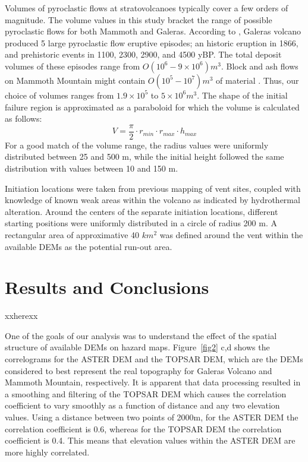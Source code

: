 \documentclass{article}
\begin{document}
Volumes of pyroclastic flows at stratovolcanoes typically cover a few
orders of magnitude. The volume values in this study bracket the range
of possible pyroclastic flows for both Mammoth and Galeras.  According
to \citet{calvache_1990a}, Galeras volcano produced 5 large
pyroclastic flow eruptive episodes; an historic eruption in 1866, and
prehistoric events in 1100, 2300, 2900, and 4500 yBP.  The total
deposit volumes of these episodes range from $O(10^6 - 9\times 10^6)
m^3$.  Block and ash flows on Mammoth Mountain might contain $O(10^5 -
10^7) m^3$ of material \citep{Patra2005, Burkett2007}.  Thus, our
choice of volumes ranges from $1.9 \times 10^5$ to $5 \times 10^6
m^3$.  The shape of the initial failure region is approximated as a
paraboloid for which the volume is calculated as follows:
\begin{equation}
 V=\frac{\pi}{2}\cdot r_{min}\cdot r_{max} \cdot h_{max}
\label{eq:three}
\end{equation}
For a good match of the volume range, the radius values were uniformly
distributed between 25 and 500 m, while the initial height followed
the same distribution with values between 10 and 150 m.

Initiation locations were taken from previous mapping of vent sites,
coupled with knowledge of known weak areas within the volcano as
indicated by hydrothermal alteration.  Around the centers of the
separate initiation locations, different starting positions were
uniformly distributed in a circle of radius 200 m.  A rectangular area
of approximative 40 $km^2$ was defined around the vent within the
available DEMs as the potential run-out area.

\section{Results and Conclusions}
xxherexx

One of the goals of our analysis was to understand the effect of the
spatial structure of available DEMs on hazard maps. Figure~\ref{fig2}
c,d shows the correlograms for the ASTER DEM and the TOPSAR DEM, which
are the DEMs considered to best represent the real topography for
Galeras Volcano and Mammoth Mountain, respectively. It is apparent
that data processing resulted in a smoothing and filtering of the
TOPSAR DEM which causes the correlation coefficient to vary smoothly
as a function of distance and any two elevation values.  Using a
distance between two points of 2000m, for the ASTER DEM the
correlation coefficient is 0.6, whereas for the TOPSAR DEM the
correlation coefficient is 0.4. This means that elevation values
within the ASTER DEM are more highly correlated.
\end{document}
